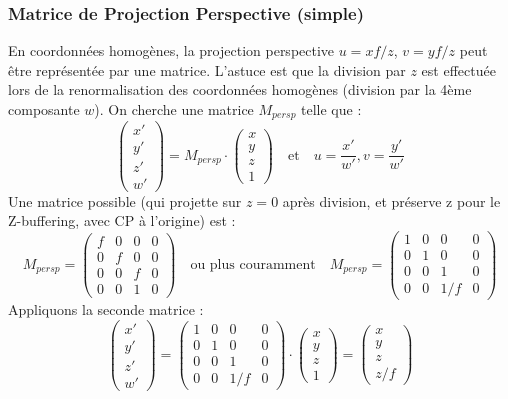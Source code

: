 \documentclass{article}
\begin{document}
\subsubsection{Matrice de Projection Perspective (simple)}
En coordonnées homogènes, la projection perspective $u = xf/z$, $v = yf/z$ peut être représentée par une matrice. L'astuce est que la division par $z$ est effectuée lors de la renormalisation des coordonnées homogènes (division par la 4ème composante $w$).
On cherche une matrice $M_{persp}$ telle que :
\[
\begin{pmatrix} x' \\ y' \\ z' \\ w' \end{pmatrix} = M_{persp} \cdot \begin{pmatrix} x \\ y \\ z \\ 1 \end{pmatrix}
\quad \text{et} \quad u = \frac{x'}{w'}, v = \frac{y'}{w'}
\]
Une matrice possible (qui projette sur $z=0$ après division, et préserve z pour le Z-buffering, avec CP à l'origine) est :
\[
M_{persp} = \begin{pmatrix}
f & 0 & 0 & 0 \\
0 & f & 0 & 0 \\
0 & 0 & f & 0 \\ %
0 & 0 & 1 & 0  %
\end{pmatrix}
 \quad \text{ou plus couramment} \quad
M_{persp} = \begin{pmatrix}
1 & 0 & 0 & 0 \\
0 & 1 & 0 & 0 \\
0 & 0 & 1 & 0 \\ %
0 & 0 & 1/f & 0  %
\end{pmatrix}
\]
Appliquons la seconde matrice :
\[
\begin{pmatrix} x' \\ y' \\ z' \\ w' \end{pmatrix} = \begin{pmatrix}
1 & 0 & 0 & 0 \\
0 & 1 & 0 & 0 \\
0 & 0 & 1 & 0 \\
0 & 0 & 1/f & 0
\end{pmatrix} \cdot \begin{pmatrix} x \\ y \\ z \\ 1 \end{pmatrix} = \begin{pmatrix} x \\ y \\ z \\ z/f \end{pmatrix}
\]
\end{document}
